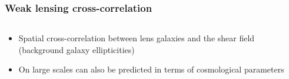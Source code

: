 \documentclass{beamer}
\begin{document}
\frame
{
    \frametitle{Weak lensing cross-correlation}


    \begin{columns}
        \begin{column}{0.5\textwidth}    
            \begin{itemize}

                \item Spatial cross-correlation between lens galaxies and
                    the shear field (background galaxy ellipticities)

                \item On large scales can also be predicted in terms of cosmological
                    parameters

            \end{itemize}
        \end{column}
        \begin{column}{0.5\textwidth}
        \end{column}
    \end{columns}

}
\end{document}
